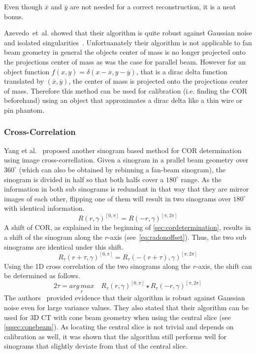 \documentclass[10pt,journal,compsoc]{IEEEtran}
\begin{document}
%
Even though $\overline{x}$ and $\overline{y}$ are not needed for a correct reconstruction, it is a neat bonus.

Azevedo~et~al. showed that their algorithm is quite robust against Gaussian noise and isolated singularities~\cite{azevedo90}.
Unfortuanately their algorithm is not applicable to fan beam geometry in general the objects center of mass is no longer projected onto the projections center of mass as was the case for parallel beam.
However for an object function $f(x,y) = \delta(x-\overline{x}, y-\overline{y})$, that is a dirac delta function translated by $(\overline{x},\overline{y})$, the center of mass is projected onto the projections center of mass.
Therefore this method can be used for calibration (i.e. finding the COR beforehand) using an object that approximates a dirac delta like a thin wire or pin phantom. 

\subsubsection{Cross-Correlation}
Yang et al.~\cite{Yang2011} proposed another sinogram based method for COR determination using image cross-correllation.
Given a sinogram in a prallel beam geometry over $360^\circ$ (which can also be obtained by rebinning a fan-beam sinogram), the sinogram is divided in half so that both halfs cover a $180^\circ$ range.
As the information in both sub sinograms is redundant in that way that they are mirror images of each other,
flipping one of them will result in two sinograms over $180^\circ$ with identical information.
%
\begin{equation}
R(r,\gamma)^{[0,\pi]} = R(-r,\gamma)^{[\pi,2\pi]}
\end{equation}
%
A shift of COR, as explained in the beginning of \cref{sec:cordetermination}, results in a shift of the sinogram along the $r$-axis (see~\cref{eq:radonoffset}).
Thus, the two sub sinograms are identical under this shift.
%
\begin{equation}
R_\tau(r+\tau,\gamma)^{[0,\pi]} = R_\tau(-(r+\tau),\gamma)^{[\pi,2\pi]}
\end{equation}
%
Using the 1D cross correlation of the two sinograms along the $r$-axis, the shift can be determined as follows.
%
\begin{equation}
2\tau = \underset{r}{arg\,max}\quad R_\tau(r,\gamma)^{[0,\pi]} \star R_\tau(-r,\gamma)^{[\pi,2\pi]}
\end{equation}
%
The authors~\cite{Yang2011} provided evidence that their algorithm is robust against Gaussian noise even for large variance values.
They also stated that their algorithm can be used for 3D CT with cone beam geometry when using the central slice (see \cref{sssec:conebeam}).
As locating the central slice is not trivial and depends on calibration as well, it was shown that the algorithm still performs well for sinograms that slightly deviate from that of the central slice. 
\end{document}
